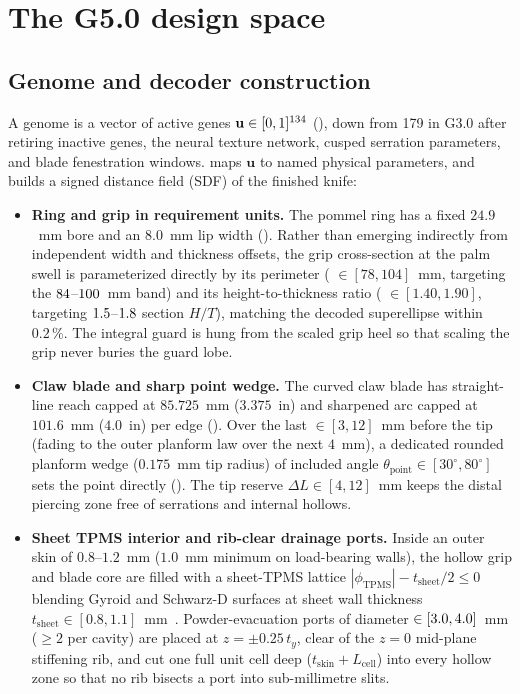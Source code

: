 \section{The G5.0 design space}\label{sec:design}
\subsection{Genome and decoder construction}
A  genome is a vector of \gGeneCount{} active genes $\mathbf{u} \in [0,1]^{134}$
(), down from 179 in G3.0 after retiring inactive genes, the neural
texture network, cusped serration parameters, and blade fenestration windows.  maps $\mathbf{u}$ to
named physical parameters, and  builds a signed distance field (SDF) of the
finished knife:
\begin{itemize}
\item \textbf{Ring and grip in requirement units.} The pommel ring has a fixed $24.9$~mm bore and an $8.0$~mm lip width
(). Rather than emerging indirectly from independent width and thickness offsets, the grip cross-section at
the palm swell is parameterized directly by its perimeter ( $\in [78, 104]$~mm, targeting the $84$--$100$~mm band) and its height-to-thickness
ratio ( $\in [1.40, 1.90]$, targeting $1.5$--$1.8$ section $H/T$), matching
the decoded superellipse within $0.2\,\%$. The integral guard is hung from the scaled grip heel so that scaling the grip
never buries the guard lobe.
\item \textbf{Claw blade and sharp point wedge.} The curved claw blade has straight-line reach capped at $85.725$~mm
($3.375$~in) and sharpened arc capped at $101.6$~mm ($4.0$~in) per edge (). Over the last
 $\in [3, 12]$~mm before the tip (fading to the outer planform law over the next $4$~mm), a dedicated rounded planform wedge ($0.175$~mm tip radius) of included angle $\theta_\mathrm{point} \in [30^\circ, 80^\circ]$ sets the point directly (). The tip reserve $\Delta L \in [4, 12]$~mm keeps the distal
piercing zone free of serrations and internal hollows.
\item \textbf{Sheet TPMS interior and rib-clear drainage ports.} Inside an outer skin of $0.8$--$1.2$~mm ($1.0$~mm minimum on
load-bearing walls), the hollow grip and blade core are filled with a sheet-TPMS lattice $|\phi_\mathrm{TPMS}| - t_\mathrm{sheet}/2 \le 0$
 blending Gyroid and Schwarz-D surfaces at sheet wall thickness $t_\mathrm{sheet} \in [0.8, 1.1]$~mm~\cite{naghavi2022,kelly2019}.
Powder-evacuation ports of diameter  $\in [3.0, 4.0]$~mm ($\ge 2$ per cavity) are placed at
$z = \pm 0.25\,t_y$, clear of the $z = 0$ mid-plane stiffening rib, and cut one full unit cell deep ($t_\mathrm{skin} + L_\mathrm{cell}$)
into every hollow zone so that no rib bisects a port into sub-millimetre slits.
\end{itemize}

